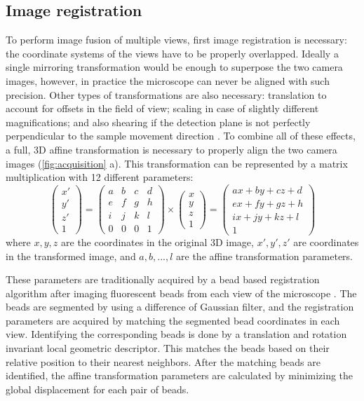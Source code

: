 \subsection{Image registration}

To perform image fusion of multiple views, first image registration is necessary: the coordinate systems of the views have to be properly overlapped. Ideally a single mirroring transformation would be enough to superpose the two camera images, however, in practice the microscope can never be aligned with such precision. Other types of transformations are also necessary: translation to account for offsets in the field of view; scaling in case of slightly different magnifications; and also shearing if the detection plane is not perfectly perpendicular to the sample movement direction \cite{krzic_multiple-view_2009}. To combine all of these effects, a full, 3D affine transformation is necessary to properly align the two camera images (\autoref{fig:acquisition} a). This transformation can be represented by a matrix multiplication with 12 different parameters:
\[  
\begin{pmatrix}
x'\\
y'\\
z'\\
1
\end{pmatrix}
=
\begin{pmatrix}
a & b & c & d \\ 
e & f & g & h \\ 
i & j & k & l \\
0 & 0 & 0 & 1 
\end{pmatrix}
\times
\begin{pmatrix}
x\\
y\\
z\\
1
\end{pmatrix}
=
\begin{pmatrix}
a x + b y + c z + d\\ 
e x + f y + g z + h\\ 
i x + j y + k z + l\\
1
\end{pmatrix}
\]
where $x, y, z$ are the coordinates in the original 3D image, $x', y', z'$ are coordinates in the transformed image, and $a, b, ..., l$ are the affine transformation parameters.

These parameters are traditionally acquired by a bead based registration algorithm after imaging fluorescent beads from each view of the microscope \cite{preibisch_bead-based_2009,preibisch_software_2010}. The beads are segmented by using a difference of Gaussian filter, and the registration parameters are acquired by matching the segmented bead coordinates in each view. Identifying the corresponding beads is done by a translation and rotation invariant local geometric descriptor. This matches the beads based on their relative position to their nearest neighbors. After the matching beads are identified, the affine transformation parameters are calculated by minimizing the global displacement for each pair of beads.

